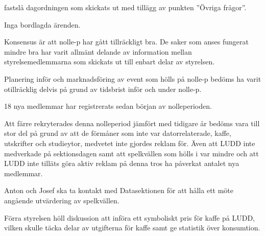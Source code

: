\documentclass{protokoll}
\begin{document}
\newpage  


\begin{beslut}
     \att fastslå dagordningen som skickats ut med tillägg av punkten ''Övriga
     frågor''.
\end{beslut}

Inga bordlagda ärenden.

Konsensus är att nolle-p har gått tillräckligt bra. De saker som anses fungerat
mindre bra har varit allmänt delande av information mellan styrelsemedlemmarna 
som skickats ut till enbart delar av styrelsen. 

Planering inför och marknadsföring av event som hölls på nolle-p bedöms ha
varit otillräcklig delvis på grund av tidsbrist inför och under nolle-p. 


18 nya medlemmar har registrerats sedan början av nolleperioden. 


Att färre rekryterades denna nolleperiod jämfört med tidigare år bedöms vara
till stor del på grund av att de förmåner som inte var datorrelaterade, kaffe,
utskrifter och studieytor, medvetet inte gjordes reklam för. 
Även att LUDD inte medverkade på sektionsdagen samt att spelkvällen som hölls 
i var mindre och att LUDD inte tilläts göra aktiv reklam på denna tros ha
påverkat antalet nya medlemmar. 


Anton och Josef ska ta kontakt med Datasektionen för att hålla ett möte
angående utvärdering av spelkvällen. 


Förra styrelsen höll diskussion att införa ett symboliskt pris för kaffe på 
LUDD, vilken skulle täcka delar av utgifterna för kaffe samt ge statistik över
konsumtion.
\end{document}
